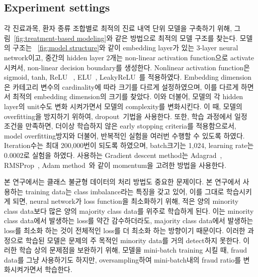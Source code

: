\documentclass[11pt]{article}           %
\begin{document}
\subsection{Experiment settings}
\label{4.2}
각 진료과목, 환자 종류 조합별로 최적의 진료 내역 단위 모델을 구축하기 위해, 그림~\ref{fig:treatment-based modeling}와 같은 방법으로 최적의 모델 구조를 찾는다.
모델의 구조는 ~\ref{fig:model structure}와 같이 embedding layer가 있는 3-layer neural network이고, 중간의 hidden layer 2개는 non-linear activation function으로 activate시켜서, non-linear decision boundary를 생성한다. 
Nonlinear activation function은 sigmoid, tanh, ReLU ~\cite{nair2010rectified}, ELU~\cite{clevert2015fast}, LeakyReLU~\cite{maas2013rectifier}를 적용하였다.
Embedding dimension은 카테고리 변수의 cardinality에 따라 크기를 다르게 설정하였으며, 이를 다르게 하면서 최적의 embedding dimension의 크기를 찾았다.
이와 더불어, 모델의 각 hidden layer의 unit수도 변화 시켜가면서 모델의 complexity를 변화시킨다. 
이 때, 모델의 overfitting을 방지하기 위하여, dropout~\cite{srivastava2014dropout}기법을 사용한다.
또한, 학습 과정에서 일정 조건을 만족하면, 더이상 학습하지 않은 early stopping criteria를 적용함으로서, model overfitting방지와 더불어, 반복적인 실험을 여러번 수행할 수 있도록 하였다.
Iteration수는 최대 200,000번이 되도록 하였으며, batch크기는 1,024, learning rate는 0.0002로 실험을 하였다.
사용하는 Gradient descent method는 Adagrad~\cite{duchi2011adaptive}, RMSProp~\cite{tieleman2012lecture}, Adam method~\cite{kingma2014adam}와 같이 momentum을 고려한 방법을 사용한다.

본 연구에서는 클래스 불균형 데이터의 처리 방법도 중요한 문제이다.
본 연구에서 사용하는 training data는 class imbalance라는 특징을 갖고 있어, 이를 그대로 학습시키게 되면, neural network가 loss function을 최소화하기 위해, 적은 양의 minority class data보다 많은 양의 majority class data를 위주로 학습하게 된다.
이는 minority class data에서 발생하는 loss를 약간 감수하더라도, majority class data에서 발생하는 loss를 최소화 하는 것이 전체적인 loss를 더 최소화 하는 방향이기 때문이다.
이러한 과정으로 학습된 모델은 문제의 주 목적인 minority data를 거의 detect하지 못한다.
이러한 학습 상의 문제점을 보완하기 위해, 모델을 mini-batch training 시킬 때, fraud data를 그냥 사용하기도 하지만, oversampling하여 mini-batch내의 fraud ratio를 변화시켜가면서 학습한다.
\end{document}
